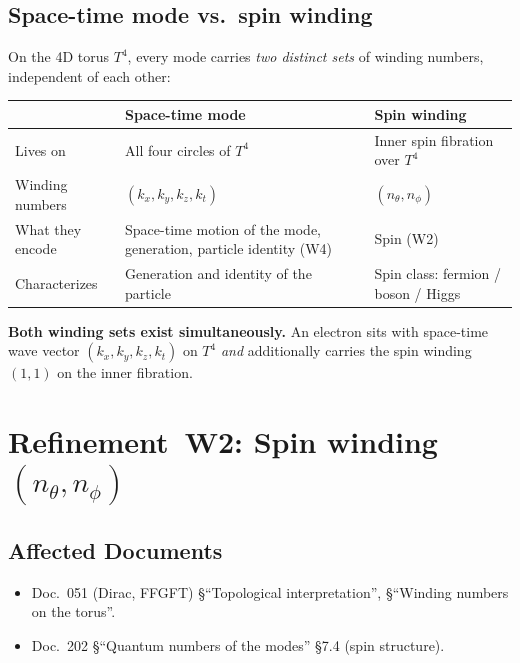 \subsection*{Space-time mode vs.\ spin winding}

On the 4D torus $T^4$, every mode carries \emph{two distinct sets}
of winding numbers, independent of each other:

\begin{center}
\renewcommand{\arraystretch}{1.4}
\setlength{\tabcolsep}{8pt}
\begin{tabular}{>{\raggedright\arraybackslash}p{3.0cm}>{\raggedright\arraybackslash}p{4.6cm}>{\raggedright\arraybackslash}p{4.8cm}}
\toprule
 & \textbf{Space-time mode} & \textbf{Spin winding} \\
\midrule
Lives on &
  All four circles of $T^4$ &
  Inner spin fibration over $T^4$ \\
Winding numbers &
  $(k_x, k_y, k_z, k_t)$ &
  $(n_\theta, n_\phi)$ \\
What they encode &
  Space-time motion of the mode, generation, particle identity (W4) &
  Spin (W2) \\
Characterizes &
  Generation and identity of the particle &
  Spin class: fermion / boson / Higgs \\
\bottomrule
\end{tabular}
\setlength{\tabcolsep}{6pt}
\renewcommand{\arraystretch}{1.0}
\end{center}

\textbf{Both winding sets exist simultaneously.} An electron sits
with space-time wave vector $(k_x,k_y,k_z,k_t)$ on $T^4$ \emph{and}
additionally carries the spin winding $(1,1)$ on the inner fibration.

\section{\texorpdfstring{Refinement~W2: Spin winding $(n_\theta, n_\phi)$}{Refinement W2: Spin winding}}

\subsection*{Affected Documents}

\begin{itemize}
  \item Doc.~051 (Dirac, FFGFT) §\enquote{Topological interpretation},
        §\enquote{Winding numbers on the torus}.
  \item Doc.~202 §\enquote{Quantum numbers of the modes} \S 7.4
        (spin structure).
\end{itemize}

